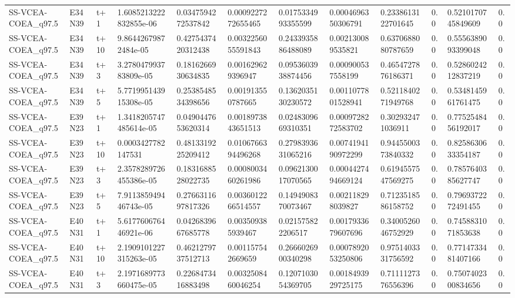 \begin{landscape}
\begin{longtable}{llllllllllll}
SS-VCEA-COEA\_q97.5 & E34N39 & t+1 & 1.6085213222832855e-06 & 0.0347594272537842 & 0.0009227272655465 & 0.0175334993355599 & 0.0004696350306791 & 0.2338613122701645 & 0.0 & 0.5210170745849609 & 0.0 \\
SS-VCEA-COEA\_q97.5 & E34N39 & t+10 & 9.86442679872484e-05 & 0.4275437420312438 & 0.0032256055591843 & 0.2433935886488089 & 0.002130089535821 & 0.6370688080787659 & 0.0 & 0.5556389093399048 & 0.0 \\
SS-VCEA-COEA\_q97.5 & E34N39 & t+3 & 3.278047993783809e-05 & 0.1816266930634835 & 0.001629629396947 & 0.0953603938874456 & 0.000900537558199 & 0.4654727876186371 & 0.0 & 0.5286024212837219 & 0.0 \\
SS-VCEA-COEA\_q97.5 & E34N39 & t+5 & 5.771995143915308e-05 & 0.2538548534398656 & 0.001913550787665 & 0.1362035130230572 & 0.0011077801528941 & 0.5211840271949768 & 0.0 & 0.5348145961761475 & 0.0 \\
SS-VCEA-COEA\_q97.5 & E39N23 & t+1 & 1.3418205747485614e-05 & 0.0490447653620314 & 0.0018973843651513 & 0.0248309669310351 & 0.0009728272583702 & 0.302932471036911 & 0.0 & 0.7752548456192017 & 0.0 \\
SS-VCEA-COEA\_q97.5 & E39N23 & t+10 & 0.0003427782147531 & 0.4813319225209412 & 0.0106766394496268 & 0.2798393631065216 & 0.0074194190972299 & 0.9445500373840332 & 0.0 & 0.8258630633354187 & 0.0 \\
SS-VCEA-COEA\_q97.5 & E39N23 & t+3 & 2.3578289726455386e-05 & 0.1831688528022735 & 0.0008003460261986 & 0.0962130017070565 & 0.0004427494669124 & 0.6194557547569275 & 0.0 & 0.7857640385627747 & 0.0 \\
SS-VCEA-COEA\_q97.5 & E39N23 & t+5 & 7.911385949446743e-05 & 0.2766311697817326 & 0.0036012266514557 & 0.1494908370073467 & 0.002118298039827 & 0.7123518586158752 & 0.0 & 0.7969372272491455 & 0.0 \\
SS-VCEA-COEA\_q97.5 & E40N31 & t+1 & 5.617760676446921e-06 & 0.0426839667685778 & 0.003509385939467 & 0.021575822206517 & 0.0017933679607696 & 0.3400526046752929 & 0.0 & 0.7458831071853638 & 0.0 \\
SS-VCEA-COEA\_q97.5 & E40N31 & t+10 & 2.1909101227315263e-05 & 0.4621279737512713 & 0.001157542669659 & 0.2666026900340298 & 0.0007892053250806 & 0.9751403331756592 & 0.0 & 0.7714733481407166 & 0.0 \\
SS-VCEA-COEA\_q97.5 & E40N31 & t+3 & 2.1971689773660475e-05 & 0.2268473416883498 & 0.0032508460046254 & 0.1207103054369705 & 0.0018493929725175 & 0.7111127376556396 & 0.0 & 0.7507402300834656 & 0.0 \\

\end{longtable}
\end{landscape}
